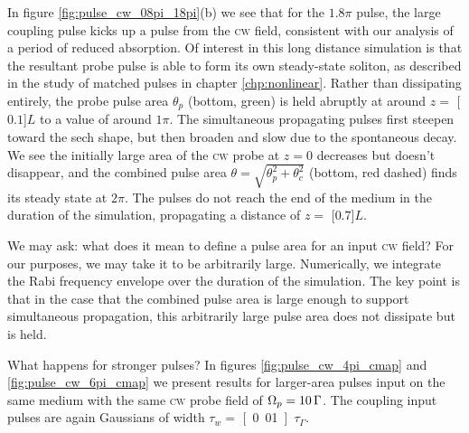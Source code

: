     In figure \ref{fig:pulse_cw_08pi_18pi}(b) we see that for the $1.8 \pi$
    pulse, the large coupling pulse kicks up a pulse from the \textsc{cw} field,
    consistent with our analysis of a period of reduced absorption. Of interest
    in this long distance simulation is that the resultant probe pulse is able
    to form its own steady-state soliton, as described in the study of matched
    pulses in chapter \ref{chp:nonlinear}. Rather than dissipating entirely, the
    probe pulse area $\theta_p$ (bottom, green) is held abruptly at around $z =
    $ \unit[$0.1$]{$L$} to a value of around $1 \pi$. The simultaneous
    propagating pulses first steepen toward the sech shape, but then broaden and
    slow due to the spontaneous decay. We see the initially large area of the
    \textsc{cw} probe at $z = 0$ decreases but doesn't disappear, and the
    combined pulse area $\theta = \sqrt{\theta_p^2 + \theta_c^2}$ (bottom, red
    dashed) finds its steady state at $2 \pi$. The pulses do not reach the end
    of the medium in the duration of the simulation, propagating a distance of
    $z = $ \unit[$0.7$]{$L$}.

    We may ask: what does it mean to define a pulse area for an input
    \textsc{cw} field? For our purposes, we may take it to be arbitrarily large.
    Numerically, we integrate the Rabi frequency envelope over the duration of
    the simulation. The key point is that in the case that the combined pulse
    area is large enough to support simultaneous propagation, this arbitrarily
    large pulse area does not dissipate but is held.

    What happens for stronger pulses? In figures \ref{fig:pulse_cw_4pi_cmap} and
    \ref{fig:pulse_cw_6pi_cmap} we present results for larger-area pulses input
    on the same medium with the same \textsc{cw} probe field of $\Omega_p =
    \unit[10]{\Gamma}$. The coupling input pulses are again Gaussians of width
    $\tau_w = $ \unit[0.01]{$\tau_\Gamma$}.

